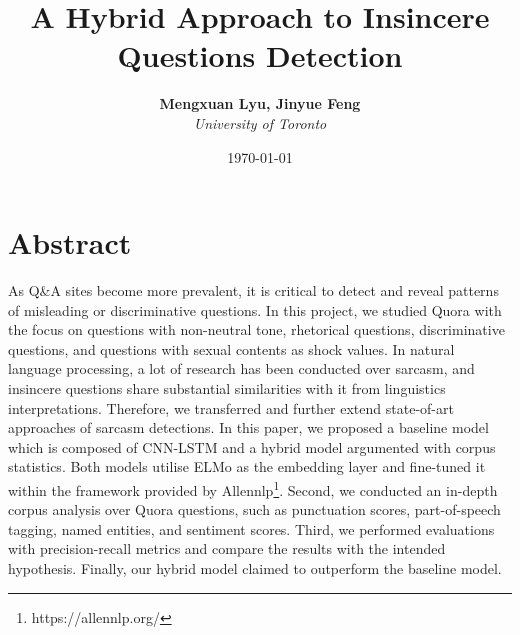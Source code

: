 \documentclass[12pt]{diazessay} %
\title{\textbf{A Hybrid Approach to Insincere Questions Detection}} %
\author{\textbf{Mengxuan Lyu, Jinyue Feng} \\ \textit{University of Toronto}} %
\date{\today} %
\begin{document}
\maketitle %






\doublespacing %

\section{Abstract}

As Q\&A sites become more prevalent, it is critical to detect and reveal patterns of misleading or discriminative questions. In this project, we studied Quora with the focus on questions with non-neutral tone, rhetorical questions, discriminative questions, and questions with sexual contents as shock values. In natural language processing, a lot of research has been conducted over sarcasm, and insincere questions share substantial similarities with it from linguistics interpretations. Therefore,  we transferred and further extend state-of-art approaches of sarcasm detections. In this paper, we proposed a baseline model which is composed of CNN-LSTM and a hybrid model argumented with corpus statistics. Both models utilise ELMo\citep{peters2018deep} as the embedding layer and fine-tuned it within the framework provided by Allennlp\footnote{https://allennlp.org/}. Second, we conducted an in-depth corpus analysis over Quora questions, such as punctuation scores, part-of-speech tagging, named entities, and sentiment scores. Third, we performed evaluations with precision-recall metrics and compare the results with the intended hypothesis. Finally, our hybrid model claimed to outperform the baseline model.
\end{document}
